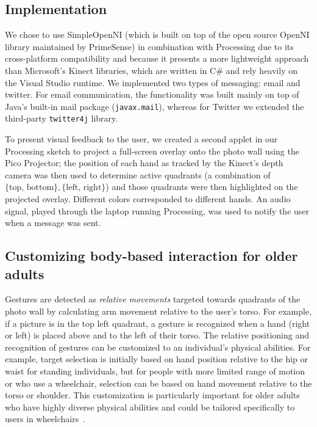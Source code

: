 \documentclass{chi-ext}
\begin{document}
\subsection{Implementation}
We chose to use SimpleOpenNI (which is built on top of the open source OpenNI library maintained by PrimeSense) in combination with Processing due to its cross-platform compatibility and because it presents a more lightweight approach than Microsoft's Kinect libraries, which are written in C\# and rely heavily on the Visual Studio runtime. We implemented two types of messaging: email and twitter. For email communication, the functionality was built mainly on top of Java's built-in mail package (\texttt{javax.mail}), whereas for Twitter we extended the third-party \texttt{twitter4j} library.

To present visual feedback to the user, we created a second applet in our Processing sketch to project a full-screen overlay onto the photo wall using the Pico Projector; the position of each hand as tracked by the Kinect's depth camera was then used to determine active quadrants (a combination of $\{\text{top, bottom}\}, \{\text{left, right}\}$) and those quadrants were then highlighted on the projected overlay. Different colors corresponded to different hands. An audio signal, played through the laptop running Processing, was used to notify the user when a message was sent.

\subsection{Customizing body-based interaction for older adults}
Gestures are detected as \emph{relative movements} targeted towards quadrants of the photo wall by calculating arm movement relative to the user's torso. For example, if a picture is in the top left quadrant, a gesture is recognized when a hand (right or left) is placed above and to the left of their torso. The relative positioning and recognition of gestures can be customized to an individual's physical abilities. For example, target selection is initially based on hand position relative to the hip or waist for standing individuals, but for people with more limited range of motion or who use a wheelchair, selection can be based on hand movement relative to the torso or shoulder. This customization is particularly important for older adults who have highly diverse physical abilities and could be tailored specifically to users in wheelchairs~\cite{gerling:2013}. 
\end{document}
